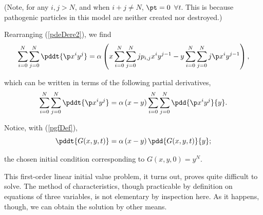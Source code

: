 \noindent
(Note, for any $i, j > N$, and when $i+j \neq N$, $\pt = 0$ $\forall t$. This is because pathogenic particles in this model are neither created nor destroyed.)

Rearranging (\ref{pdeDere2}), we find
\begin{equation*}
\label{pdeDerev2}
\sum_{i = 0}^N\sum_{j=0}^N\pddt{\p x^iy^j} = \alpha\left(x\sum_{i = 0}^N\sum_{j=0}^N j p_{i,j}x^{i}y^{j-1} -  y\sum_{i = 0}^N\sum_{j=0}^Nj \p x^iy^{j-1} \right),
\end{equation*}

\noindent
which can be written in terms of the following partial derivatives,
\begin{equation*}
\label{pdeDerev2b}
\sum_{i = 0}^N\sum_{j=0}^N\pddt{\p x^iy^j} = \alpha\left(x - y\right)\sum_{i = 0}^N\sum_{j=0}^N \pdd{\p x^iy^j}{y}.
\end{equation*}

\noindent
Notice, with (\ref{pgfDef}),
\begin{equation}
\label{PDE1}
\pddt{G(x,y,t)} = \alpha\left(x - y\right) \pdd{G(x,y,t)}{y};
\end{equation}

\noindent
the chosen initial condition corresponding to $G(x,y,0) = y^N$.

This first-order linear initial value problem, it turns out, proves quite difficult to solve. The method of characteristics, though practicable by definition on equations of three variables, is not elementary by inspection here. As it happens, though, we can obtain the solution by other means.

